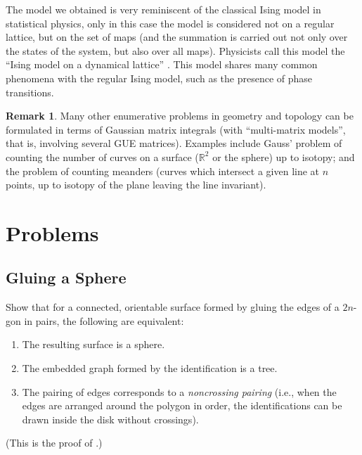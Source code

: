 \documentclass[letterpaper,11pt,oneside,reqno]{book}
\numberwithin{equation}{chapter}  %
\theoremstyle{definition}
\newtheorem{remark}[proposition]{Remark}
\begin{document}
The model we obtained is very reminiscent of the classical Ising model in statistical physics, only in this case the model is considered not on a regular lattice, but on the set of maps (and the summation is carried out not only over the states of the system, but also over all maps). Physicists call this model the ``Ising model on a dynamical lattice'' \cite{itzykson1980planar}. This model shares many common phenomena with the regular Ising model, such as the presence of phase transitions.


\begin{remark}
	Many other enumerative problems in geometry and topology can be
	formulated in terms of Gaussian matrix integrals (with ``multi-matrix models'', that is,
	involving several GUE matrices).
	Examples include
	Gauss' problem of counting the number of curves on a surface ($\mathbb{R}^2$ or the sphere)
	up to isotopy; and the problem of counting meanders (curves which intersect a given
	line at $n$ points, up to isotopy of the plane leaving the line invariant).
\end{remark}
































\section{Problems}

\subsection{Gluing a Sphere}
\label{lecture15:prob:gluing_sphere}
Show that for a connected, orientable surface formed by gluing the edges of a $2n$-gon in pairs, the following are equivalent:
\begin{enumerate}
	\item The resulting surface is a sphere.
	\item The embedded graph formed by the identification is a tree.
	\item The pairing of edges corresponds to a \emph{noncrossing pairing} (i.e., when the edges are arranged around the polygon in order, the identifications can be drawn inside the disk without crossings).
\end{enumerate}
(This is the proof of .)
\end{document}
